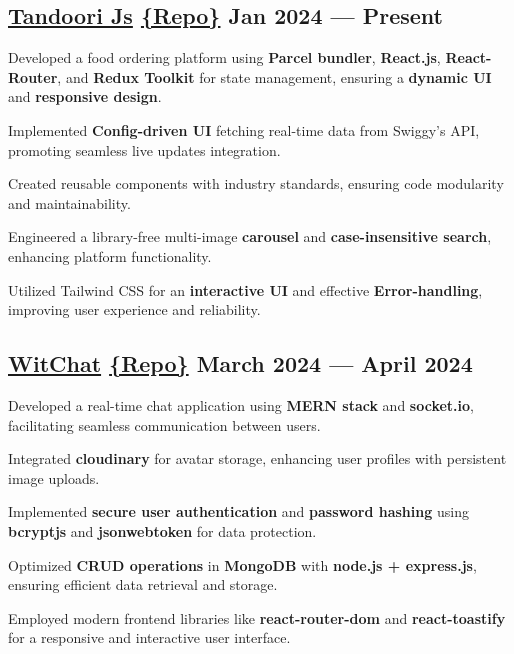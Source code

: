 \subsection{\href{https://tandoori-js.vercel.app}{Tandoori Js} \href{https://github.com/thekiranmahajan/tandoori-js}{\{Repo\}} \hfill Jan 2024 --- Present}
\begin{zitemize}
\item Developed a food ordering platform using \textbf{Parcel bundler}, \textbf{React.js}, \textbf{React-Router}, and \textbf{Redux Toolkit} for state management, ensuring a \textbf{dynamic UI} and \textbf{responsive design}.
\item Implemented \textbf{Config-driven UI} fetching real-time data from Swiggy's API, promoting seamless live updates integration.
\item Created reusable components with industry standards, ensuring code modularity and maintainability.
\item Engineered a library-free multi-image \textbf{carousel} and \textbf{case-insensitive search}, enhancing platform functionality.
\item Utilized Tailwind CSS for an \textbf{interactive UI} and effective \textbf{Error-handling}, improving user experience and reliability.
\end{zitemize}

\subsection{\href{http://wit-chat.onrender.com/}{WitChat} \href{https://github.com/thekiranmahajan/wit-chat}{\{Repo\}} \hfill March 2024 --- April 2024}
\begin{zitemize}
\item Developed a real-time chat application using \textbf{MERN stack} and \textbf{socket.io}, facilitating seamless communication between users.
\item Integrated \textbf{cloudinary} for avatar storage, enhancing user profiles with persistent image uploads.
\item Implemented \textbf{secure user authentication} and \textbf{password hashing} using \textbf{bcryptjs} and \textbf{jsonwebtoken} for data protection.
\item Optimized \textbf{CRUD operations} in \textbf{MongoDB} with \textbf{node.js + express.js}, ensuring efficient data retrieval and storage.
\item Employed modern frontend libraries like \textbf{react-router-dom} and \textbf{react-toastify} for a responsive and interactive user interface.
\end{zitemize}

